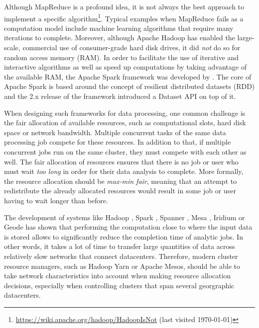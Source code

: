 Although MapReduce is a profound idea, it is not always the best approach to implement a specific algorithm\footnote{\url{https://wiki.apache.org/hadoop/HadoopIsNot} (last visited \today)}. Typical examples when MapReduce fails as a computation model include machine learning algorithms that require many iterations to complete. Moreover, although Apache Hadoop has enabled the large-scale, commercial use of consumer-grade hard disk drives, it did \emph{not} do so for random access memory (RAM). In order to facilitate the use of iterative and interactive algorithms as well as speed up computations by taking advantage of the available RAM, the Apache Spark framework was developed by \citet{2016-zaharia-spark}. The core of Apache Spark is based around the concept of resilient distributed datasets (RDD) and the 2.x release of the framework introduced a Dataset API on top of it.

When designing such frameworks for data processing, one common challenge is the fair allocation of available resources, such as computational slots, hard disk space or network bandwidth. Multiple concurrent tasks of the same data processing job compete for these resources. In addition to that, if multiple concurrent jobs run on the same cluster, they must compete with each other as well. The fair allocation of resources ensures that there is no job or user who must wait \emph{too long} in order for their data analysis to complete. More formally, the resource allocation should be \emph{max-min fair}, meaning that an attempt to redistribute the already allocated resources would result in some job or user having to wait longer than before.

The development of systems like Hadoop \cite{2008-zaharia-hadoop-late}, Spark \cite{2016-zaharia-spark}, Spanner \cite{Corbett2012}, Mesa \cite{Gupta2014}, Iridium \cite{Pu2015} or Geode \cite{Vulimiri2015} has shown that performing the computation close to where the input data is stored allows to significantly reduce the completion time of analytic jobs. In other words, it takes a lot of time to transfer large quantities of data across relatively slow networks that connect datacenters. Therefore, modern cluster resource managers, such as Hadoop Yarn or Apache Mesos, should be able to take network characteristics into account when making resource allocation decisions, especially when controlling clusters that span several georgraphic datacenters.

